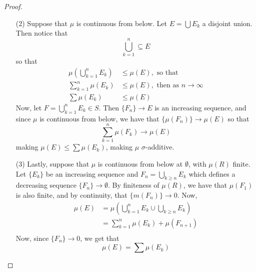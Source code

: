 \begin{proof}
\begin{enumerate}
        \item[(2)] Suppose that $\mu$ is continuous from below. Let
            $E=\bigcup{E_k}$ a disjoint union. Then notice that
            \begin{equation*}
                \bigcup_{k=1}^n \subseteq E
            \end{equation*}
            so that
            \begin{align*}
                \mu(\bigcup_{k=1}^n{E_k}) &\leq \mu(E), \text{ so that} \\
                \sum_{k=1}^{n}{\mu(E_k)} &\leq \mu(E), \text{ then as } n
                \xrightarrow{} \infty \\
                \sum{\mu(E_k)} &\leq \mu(E)
            \end{align*}
            Now, let $F=\bigcup_{k=1}^n{E_k} \in S$. Then $\{F_n\}
            \xrightarrow{} E$ is an increasing sequence, and since $\mu$ is
            continuous from below, we have that  $\{\mu(F_n)\} \xrightarrow{}
            \mu(E)$ so that
            \begin{equation*}
                \sum_{k=1}^n{\mu(F_k)} \xrightarrow{} \mu(E)
            \end{equation*}
            making $\mu(E) \leq \sum{\mu(E_k)}$, making $\mu$ $\sigma$-additive.

        \item[(3)] Lastly, suppose that $\mu$ is continuous from below at
            $\emptyset$, with  $\mu(R)$ finite. Let $\{E_k\}$ be an increasing
            sequence and $F_n=\bigcup_{k \geq n}{E_k}$ which defines a
            decreasing sequence $\{F_n\} \xrightarrow{} \emptyset$. By
            finiteness of $\mu(R)$, we have that $\mu(F_1)$ is also finite, and
            by continuity, that $\{m(F_n)\} \xrightarrow{} 0$. Now,
            \begin{align*}
                \mu(E) &= \mu( \bigcup_{k=1}^n{E_k} \cup \bigcup_{k \geq n}{E_k}) \\
                     &= \sum_{k=1}^n{\mu(E_k)}+\mu(F_{n+1}) \\
            \end{align*}
            Now, since $\{F_n\} \xrightarrow{} 0$, we get that
            \begin{equation*}
                \mu(E)=\sum{\mu(E_k)}
            \end{equation*}
    \end{enumerate}
\end{proof}

